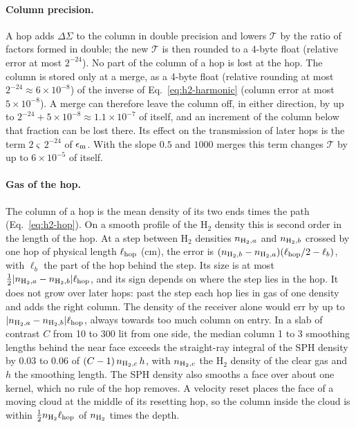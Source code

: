 \paragraph{Column precision.} A hop adds $\Delta\Sigma$ to the column in double
precision and lowers $\mathcal T$ by the ratio of factors formed in double; the
new $\mathcal T$ is then rounded to a 4-byte float (relative error at most
$2^{-24}$). No part of the column of a hop is lost at the hop. The column is
stored only at a merge, as a 4-byte
float (relative rounding at most $2^{-24}\approx6\times10^{-8}$) of the
inverse of Eq.~\eqref{eq:h2-harmonic} (column error at most $5\times10^{-8}$).
A merge can therefore leave the column off, in either direction, by up to
$2^{-24}+5\times10^{-8}\approx1.1\times10^{-7}$ of itself, and an increment of the column below that
fraction can be lost there. Its effect on the transmission of later hops is
the term $2\varsigma\,2^{-24}$ of $\epsilon_{\rm m}$. With the slope $0.5$ and
$1000$ merges this term changes $\mathcal T$ by up to $6\times10^{-5}$ of
itself.

\paragraph{Gas of the hop.} The column of a hop is the mean density of its
two ends times the path (Eq.~\eqref{eq:h2-hop}). On a smooth profile of the
H$_2$ density this is second order in the length of the hop. At a step
between H$_2$ densities $n_{{\rm H}_2,a}$ and $n_{{\rm H}_2,b}$ crossed by one
hop of physical length $\ell_{\rm hop}$ (cm), the error is
$(n_{{\rm H}_2,b}-n_{{\rm H}_2,a})(\ell_{\rm hop}/2-\ell_b)$, with $\ell_b$ the
part of the hop behind the step. Its size is at most
$\tfrac12|n_{{\rm H}_2,a}-n_{{\rm H}_2,b}|\ell_{\rm hop}$, and its sign depends
on where the step lies in the hop. It does not grow over later hops: past the
step each hop lies in gas of one density and adds the right column. The
density of the receiver alone would err by up to
$|n_{{\rm H}_2,a}-n_{{\rm H}_2,b}|\ell_{\rm hop}$, always towards too much
column on entry. In a slab of contrast $C$ from 10 to 300 lit from one side,
the median column 1 to 3 smoothing lengths behind the near face exceeds the
straight-ray integral of the SPH density by 0.03 to 0.06 of
$(C-1)\,n_{{\rm H}_2,c}\,h$, with $n_{{\rm H}_2,c}$ the H$_2$ density of the
clear gas and $h$ the smoothing length. The SPH density
also smooths a face over about one kernel, which no rule of the hop removes.
A velocity reset places the face of a moving cloud at the middle of its
resetting hop, so the column inside the cloud is within
$\tfrac12 n_{{\rm H}_2}\ell_{\rm hop}$ of $n_{{\rm H}_2}$ times the depth.

